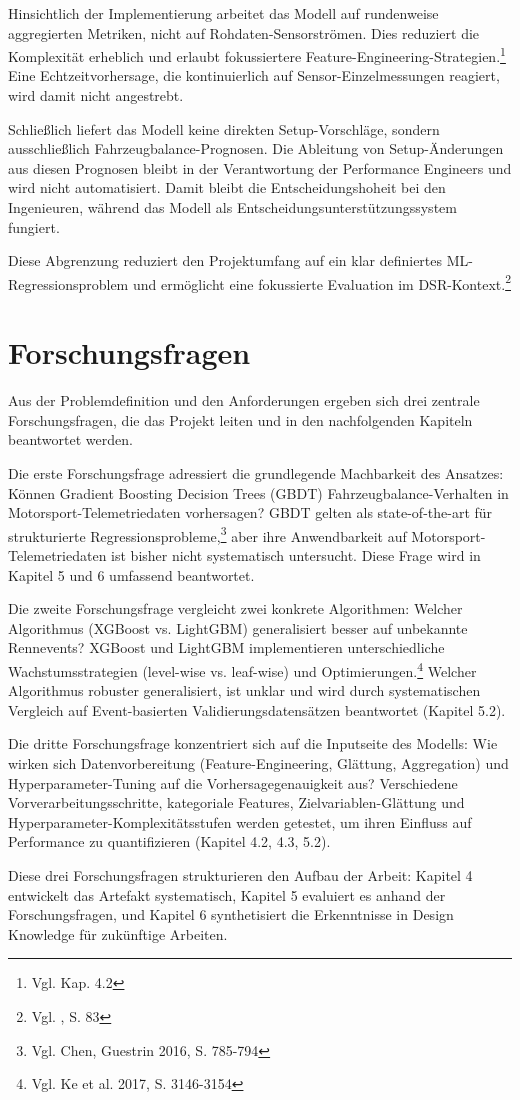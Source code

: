 Hinsichtlich der Implementierung arbeitet das Modell auf rundenweise aggregierten Metriken, nicht auf Rohdaten-Sensorströmen. Dies reduziert die Komplexität erheblich und erlaubt fokussiertere Feature-Engineering-Strategien.\footnote{Vgl. Kap. 4.2} Eine Echtzeitvorhersage, die kontinuierlich auf Sensor-Einzelmessungen reagiert, wird damit nicht angestrebt.

Schließlich liefert das Modell keine direkten Setup-Vorschläge, sondern ausschließlich Fahrzeugbalance-Prognosen. Die Ableitung von Setup-Änderungen aus diesen Prognosen bleibt in der Verantwortung der Performance Engineers und wird nicht automatisiert. Damit bleibt die Entscheidungshoheit bei den Ingenieuren, während das Modell als Entscheidungsunterstützungssystem fungiert.

Diese Abgrenzung reduziert den Projektumfang auf ein klar definiertes \ac{ML}-Regressionsproblem und ermöglicht eine fokussierte Evaluation im DSR-Kontext.\footnote{Vgl. \cite{Hevner2004}, S. 83}



\section{Forschungsfragen}

Aus der Problemdefinition und den Anforderungen ergeben sich drei zentrale Forschungsfragen, die das Projekt leiten und in den nachfolgenden Kapiteln beantwortet werden.

Die erste Forschungsfrage adressiert die grundlegende Machbarkeit des Ansatzes: Können Gradient Boosting Decision Trees (GBDT) Fahrzeugbalance-Verhalten in Motorsport-Telemetriedaten vorhersagen? GBDT gelten als state-of-the-art für strukturierte Regressionsprobleme,\footnote{Vgl. Chen, Guestrin 2016, S. 785-794} aber ihre Anwendbarkeit auf Motorsport-Telemetriedaten ist bisher nicht systematisch untersucht. Diese Frage wird in Kapitel 5 und 6 umfassend beantwortet.

Die zweite Forschungsfrage vergleicht zwei konkrete Algorithmen: Welcher Algorithmus (XGBoost vs. LightGBM) generalisiert besser auf unbekannte Rennevents? XGBoost und LightGBM implementieren unterschiedliche Wachstumsstrategien (level-wise vs. leaf-wise) und Optimierungen.\footnote{Vgl. Ke et al. 2017, S. 3146-3154} Welcher Algorithmus robuster generalisiert, ist unklar und wird durch systematischen Vergleich auf Event-basierten Validierungsdatensätzen beantwortet (Kapitel 5.2).

Die dritte Forschungsfrage konzentriert sich auf die Inputseite des Modells: Wie wirken sich Datenvorbereitung (Feature-Engineering, Glättung, Aggregation) und Hyperparameter-Tuning auf die Vorhersagegenauigkeit aus? Verschiedene Vorverarbeitungsschritte, kategoriale Features, Zielvariablen-Glättung und Hyperparameter-Komplexitätsstufen werden getestet, um ihren Einfluss auf Performance zu quantifizieren (Kapitel 4.2, 4.3, 5.2).

Diese drei Forschungsfragen strukturieren den Aufbau der Arbeit: Kapitel 4 entwickelt das Artefakt systematisch, Kapitel 5 evaluiert es anhand der Forschungsfragen, und Kapitel 6 synthetisiert die Erkenntnisse in Design Knowledge für zukünftige Arbeiten.